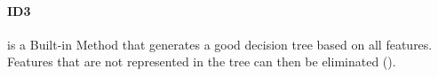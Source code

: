 \paragraph{ID3}
\label{par:methods.flat.embedded.id3}


is a Built-in Method that generates a good decision tree based on all
features. Features that are not represented in the tree can then be eliminated
(\cite{Quinlan:86}).
